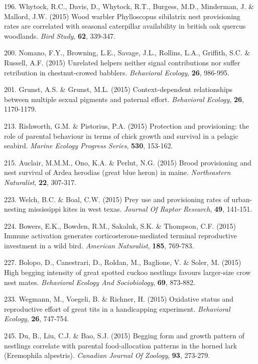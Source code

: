 196. Whytock, R.C., Davis, D., Whytock, R.T., Burgess, M.D., Minderman, J. \&  Mallord, J.W. (2015) Wood warbler Phylloscopus sibilatrix nest provisioning rates are correlated with seasonal caterpillar availability in british oak quercus woodlands. \textit{Bird Study},  \textbf{62}, 339-347.

200. Nomano, F.Y., Browning, L.E., Savage, J.L., Rollins, L.A., Griffith, S.C. \&  Russell, A.F. (2015) Unrelated helpers neither signal contributions nor suffer retribution in chestnut-crowed babblers. \textit{Behavioral Ecology},  \textbf{26}, 986-995.

201. Grunst, A.S. \&  Grunst, M.L. (2015) Context-dependent relationships between multiple sexual pigments and paternal effort. \textit{Behavioral Ecology},  \textbf{26}, 1170-1179.

213. Rishworth, G.M. \&  Pistorius, P.A. (2015) Protection and provisioning: the role of parental behaviour in terms of chick growth and survival in a pelagic seabird. \textit{Marine Ecology Progress Series},  \textbf{530}, 153-162.

215. Auclair, M.M.M., Ono, K.A. \&  Perlut, N.G. (2015) Brood provisioning and nest survival of Ardea herodias (great blue heron) in maine. \textit{Northeastern Naturalist},  \textbf{22}, 307-317.

223. Welch, B.C. \&  Boal, C.W. (2015) Prey use and provisioning rates of urban-nesting mississippi kites in west texas. \textit{Journal Of Raptor Research},  \textbf{49}, 141-151.

224. Bowers, E.K., Bowden, R.M., Sakaluk, S.K. \&  Thompson, C.F. (2015) Immune activation generates corticosterone-mediated terminal reproductive investment in a wild bird. \textit{American Naturalist},  \textbf{185}, 769-783.

227. Bolopo, D., Canestrari, D., Roldan, M., Baglione, V. \&  Soler, M. (2015) High begging intensity of great spotted cuckoo nestlings favours larger-size crow nest mates. \textit{Behavioral Ecology And Sociobiology},  \textbf{69}, 873-882.

233. Wegmann, M., Voegeli, B. \&  Richner, H. (2015) Oxidative status and reproductive effort of great tits in a handicapping experiment. \textit{Behavioral Ecology},  \textbf{26}, 747-754.

245. Du, B., Liu, C.J. \&  Bao, S.J. (2015) Begging form and growth pattern of nestlings correlate with parental food-allocation patterns in the horned lark (Eremophila alpestris). \textit{Canadian Journal Of Zoology},  \textbf{93}, 273-279.


